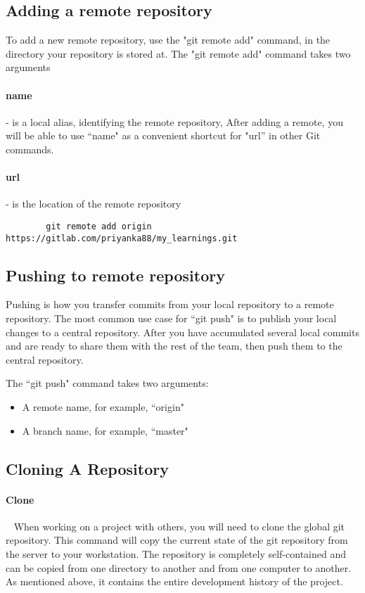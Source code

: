 \documentclass{book}
\begin{document}
    \subsection*{Adding a remote repository}

    To add a new remote repository, use the "git remote add" command, in
    the directory your repository is stored at. The "git remote add"
    command takes two arguments

    \paragraph {name} - is a local alias, identifying the remote repository, After adding a remote, you will be able to use ``name" as a convenient shortcut for "url” in other Git commands.
    \paragraph {url} - is the location of the remote repository
    \begin{verbatim}
        git remote add origin https://gitlab.com/priyanka88/my_learnings.git
    \end{verbatim}

    \subsection*{Pushing to remote repository}

    Pushing is how you transfer commits from your local repository to a remote repository. The most common use case for ``git push" is to publish your local changes to a central repository. After you have accumulated several local commits and are ready to share them with the rest of the team, then push them to the central repository.

    The ``git push" command takes two arguments:
    \begin{itemize}
        \item A remote name, for example, ``origin"
        \item A branch name, for example, ``master"
    \end{itemize}

    \subsection*{Cloning A Repository}
    \paragraph{Clone} ~
    When working on a project with others, you will need to clone the global git repository. This command will copy the current state of the git repository from the server to your workstation. The repository is completely self-contained and can be copied from one directory to another and from one computer to another. As mentioned above, it contains the entire development history of the project.
\end{document}
